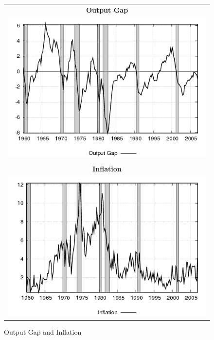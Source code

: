 


\begin{figure}
\caption{Output Gap and Inflation}\label{fg3:data}
\begin{center}
\begin{tabular}{c}
\textbf{Output Gap} \\
\includegraphics[scale=0.5]{results_re/output.png} \\ \\
\textbf{Inflation} \\ 
\includegraphics[scale=0.5]{results_re/inflation.png} \\
\end{tabular}
\end{center}
\end{figure}

